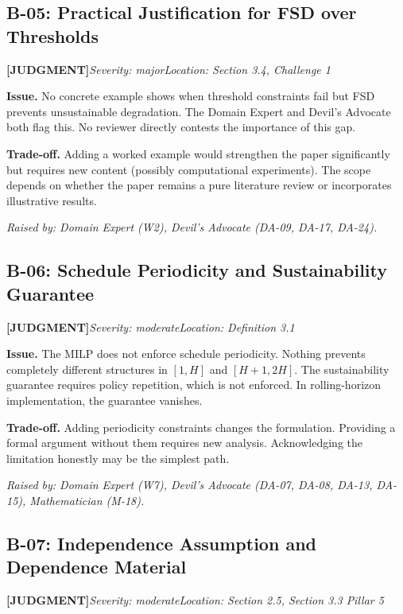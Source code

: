 \documentclass[11pt,a4paper]{article}
\newcommand{\judgmentlabel}{\textbf{\textcolor{judgmentorange}{[JUDGMENT]}}}
\begin{document}
\bigskip

\subsection{B-05: Practical Justification for FSD over Thresholds}
\judgmentlabel\quad\textit{Severity: major}\quad\textit{Location: Section 3.4, Challenge 1}

\textbf{Issue.} No concrete example shows when threshold constraints fail but FSD prevents unsustainable degradation. The Domain Expert and Devil's Advocate both flag this. No reviewer directly contests the importance of this gap.

\textbf{Trade-off.} Adding a worked example would strengthen the paper significantly but requires new content (possibly computational experiments). The scope depends on whether the paper remains a pure literature review or incorporates illustrative results.

\textit{Raised by: Domain Expert (W2), Devil's Advocate (DA-09, DA-17, DA-24).}

\bigskip

\subsection{B-06: Schedule Periodicity and Sustainability Guarantee}
\judgmentlabel\quad\textit{Severity: moderate}\quad\textit{Location: Definition 3.1}

\textbf{Issue.} The MILP does not enforce schedule periodicity. Nothing prevents completely different structures in $[1,H]$ and $[H{+}1,2H]$. The sustainability guarantee requires policy repetition, which is not enforced. In rolling-horizon implementation, the guarantee vanishes.

\textbf{Trade-off.} Adding periodicity constraints changes the formulation. Providing a formal argument without them requires new analysis. Acknowledging the limitation honestly may be the simplest path.

\textit{Raised by: Domain Expert (W7), Devil's Advocate (DA-07, DA-08, DA-13, DA-15), Mathematician (M-18).}

\bigskip

\subsection{B-07: Independence Assumption and Dependence Material}
\judgmentlabel\quad\textit{Severity: moderate}\quad\textit{Location: Section 2.5, Section 3.3 Pillar 5}
\end{document}
